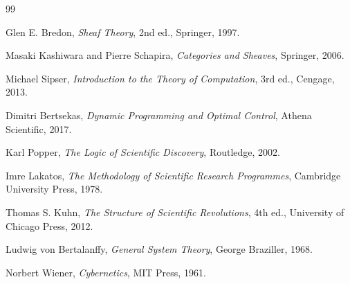 \documentclass[11pt,oneside]{book}
\numberwithin{equation}{chapter}
\theoremstyle{definition}
\theoremstyle{plain}
\begin{document}
\begin{thebibliography}{99}

Glen E. Bredon,
\emph{Sheaf Theory},
2nd ed.,
Springer,
1997.

Masaki Kashiwara and Pierre Schapira,
\emph{Categories and Sheaves},
Springer,
2006.


Michael Sipser,
\emph{Introduction to the Theory of Computation},
3rd ed.,
Cengage,
2013.


Dimitri Bertsekas,
\emph{Dynamic Programming and Optimal Control},
Athena Scientific,
2017.


Karl Popper,
\emph{The Logic of Scientific Discovery},
Routledge,
2002.

Imre Lakatos,
\emph{The Methodology of Scientific Research Programmes},
Cambridge University Press,
1978.

Thomas S. Kuhn,
\emph{The Structure of Scientific Revolutions},
4th ed.,
University of Chicago Press,
2012.


Ludwig von Bertalanffy,
\emph{General System Theory},
George Braziller,
1968.


Norbert Wiener,
\emph{Cybernetics},
MIT Press,
1961.


\end{thebibliography}
\end{document}
